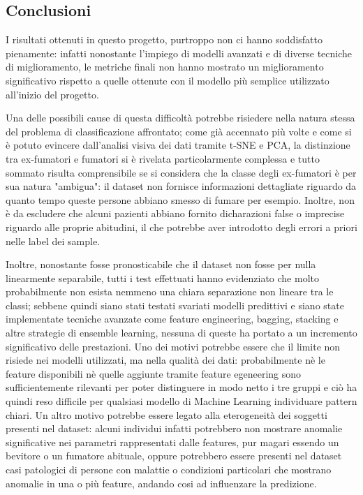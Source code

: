 \documentclass{article}
\begin{document}
\begin{multicols}{2}

\section{Conclusioni}

I risultati ottenuti in questo progetto, purtroppo non ci hanno soddisfatto pienamente: infatti nonostante l’impiego di modelli avanzati e di diverse tecniche di miglioramento, le metriche finali non hanno mostrato un miglioramento significativo rispetto a quelle ottenute con il modello più semplice utilizzato all’inizio del progetto.

Una delle possibili cause di questa difficoltà potrebbe risiedere nella natura stessa del problema di classificazione affrontato; come già accennato più volte e come si è potuto evincere dall'analisi visiva dei dati tramite t-SNE e PCA, la distinzione tra ex-fumatori e fumatori si è rivelata particolarmente complessa e tutto sommato risulta comprensibile se si considera che la classe degli ex-fumatori è per sua natura "ambigua": il dataset non fornisce informazioni dettagliate riguardo da quanto tempo queste persone abbiano smesso di fumare per esempio.
Inoltre, non è da escludere che alcuni pazienti abbiano fornito dicharazioni false o imprecise riguardo alle proprie abitudini, il che potrebbe aver introdotto degli errori a priori nelle label dei sample.

Inoltre, nonostante fosse pronosticabile che il dataset non fosse per nulla linearmente separabile, tutti i test effettuati hanno evidenziato che molto probabilmente non esista nemmeno una chiara separazione non lineare tra le classi; sebbene quindi siano stati testati svariati modelli predittivi e siano state implementate tecniche avanzate come feature engineering, bagging, stacking e altre strategie di ensemble learning, nessuna di queste ha portato a un incremento significativo delle prestazioni.
Uno dei motivi potrebbe essere che il limite non risiede nei modelli utilizzati, ma nella qualità dei dati: probabilmente nè le feature disponibili nè quelle aggiunte tramite feature egeneering sono sufficientemente rilevanti per poter distinguere in modo netto i tre gruppi e ciò ha quindi reso difficile per qualsiasi modello di Machine Learning individuare pattern chiari.
Un altro motivo potrebbe essere legato alla eterogeneità dei soggetti presenti nel dataset: alcuni individui infatti potrebbero non mostrare anomalie significative nei parametri rappresentati dalle features, pur magari essendo un bevitore o un fumatore abituale, oppure potrebbero essere presenti nel dataset casi patologici di persone con malattie o condizioni particolari che mostrano anomalie in una o più feature, andando cosi ad influenzare la predizione.


\end{multicols}
\end{document}
